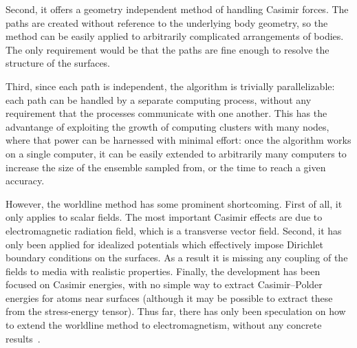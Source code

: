 Second, it offers a geometry independent method of handling Casimir forces.  The paths are 
created without reference to the underlying body geometry, so the method can be easily applied to arbitrarily
complicated arrangements of bodies.  The only requirement would be that the paths are fine enough
to resolve the structure of the surfaces.  

Third, since each path is independent, the algorithm is trivially parallelizable: each path
can be handled by a separate computing process, without any requirement that the processes communicate
with one another.  This has the advantange of exploiting the growth of computing clusters with many nodes,
where that power can be harnessed with minimal effort: once the algorithm works on a single computer,
it can be easily extended to arbitrarily many computers to increase the size of the ensemble sampled
from, or the time to reach a given accuracy.  




However, the worldline method has some prominent shortcoming.  First of all, it only applies 
to scalar fields.
  The most important Casimir effects are due to electromagnetic radiation field, 
which is a transverse vector field.
  Second, it has only been applied for idealized potentials which effectively impose 
Dirichlet boundary conditions on the surfaces.  As a result it is missing any 
coupling of the fields to media with realistic properties.
Finally, the development has been focused on Casimir energies, with no simple way to 
extract Casimir--Polder energies for atoms near surfaces 
(although it may be possible to extract these from the stress-energy tensor). 
Thus far, there has only been speculation on how to extend the worldline method to 
electromagnetism, without any concrete results~\cite{Aehlig2011}.  

